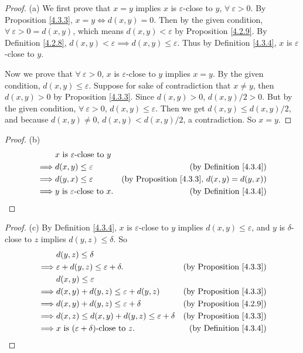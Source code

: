 \begin{proof}{(a)}
We first prove that \(x = y\) implies \(x\) is \(\varepsilon\)-close to \(y\), \(\forall\ \varepsilon > 0\).
By Proposition \ref{4.3.3}, \(x = y \iff d(x, y) = 0\).
Then by the given condition, \(\forall\ \varepsilon > 0 = d(x, y)\), which means \(d(x, y) < \varepsilon\) by Proposition \ref{4.2.9}.
By Definition \ref{4.2.8}, \(d(x, y) < \varepsilon \implies d(x, y) \leq \varepsilon\).
Thus by Definition \ref{4.3.4}, \(x\) is \(\varepsilon\)-close to \(y\).

Now we prove that \(\forall\ \varepsilon > 0\), \(x\) is \(\varepsilon\)-close to \(y\) implies \(x = y\).
By the given condition, \(d(x, y) \leq \varepsilon\).
Suppose for sake of contradiction that \(x \neq y\), then \(d(x, y) > 0\) by Proposition \ref{4.3.3}.
Since \(d(x, y) > 0\), \(d(x, y) / 2 > 0\).
But by the given condition, \(\forall\ \varepsilon > 0\), \(d(x, y) \leq \varepsilon\).
Then we get \(d(x, y) \leq d(x, y) / 2\), and because \(d(x, y) \neq 0\), \(d(x, y) < d(x, y) / 2\), a contradiction.
So \(x = y\).
\end{proof}

\begin{proof}{(b)}
\begin{align*}
& x \text{ is \(\varepsilon\)-close to } y \\
\implies & d(x, y) \leq \varepsilon & \text{(by Definition \ref{4.3.4})} \\
\implies & d(y, x) \leq \varepsilon & \text{(by Proposition \ref{4.3.3}, \(d(x, y) = d(y, x)\))} \\
\implies & y \text{ is \(\varepsilon\)-close to } x. & \text{(by Definition \ref{4.3.4})}
\end{align*}
\end{proof}

\begin{proof}{(c)}
By Definition \ref{4.3.4}, \(x\) is \(\varepsilon\)-close to \(y\) implies \(d(x, y) \leq \varepsilon\), and \(y\) is \(\delta\)-close to \(z\) implies \(d(y, z) \leq \delta\).
So
\begin{align*}
& d(y, z) \leq \delta \\
\implies & \varepsilon + d(y, z) \leq \varepsilon + \delta. & \text{(by Proposition \ref{4.3.3})} \\
& d(x, y) \leq \varepsilon \\
\implies & d(x, y) + d(y, z) \leq \varepsilon + d(y, z) & \text{(by Proposition \ref{4.3.3})} \\
\implies & d(x, y) + d(y, z) \leq \varepsilon + \delta & \text{(by Proposition \ref{4.2.9})} \\
\implies & d(x, z) \leq d(x, y) + d(y, z) \leq \varepsilon + \delta & \text{(by Proposition \ref{4.3.3})} \\
\implies & x \text{ is \((\varepsilon + \delta)\)-close to } z. & \text{(by Definition \ref{4.3.4})}
\end{align*}
\end{proof}

